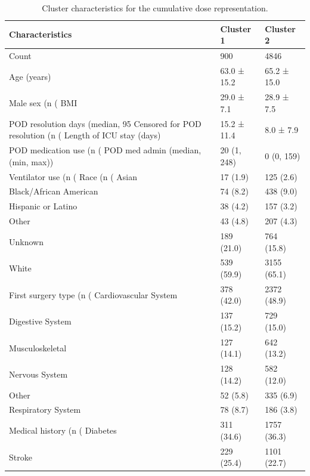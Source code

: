\begin{table}

\caption{Cluster characteristics for the cumulative dose representation.}
\centering
\begin{tabular}[t]{lll}
\toprule
Characteristics & Cluster 1 & Cluster 2\\
\midrule
Count & 900 & 4846\\
Age (years) & 63.0 ± 15.2 & 65.2 ± 15.0\\
Male sex (n (%
BMI & 29.0 ± 7.1 & 28.9 ± 7.5\\
POD resolution days (median, 95%
\addlinespace
Censored for POD resolution (n (%
Length of ICU stay (days) & 15.2 ± 11.4 & 8.0 ± 7.9\\
POD medication use (n (%
POD med admin (median, (min, max)) & 20 (1, 248) & 0 (0, 159)\\
Ventilator use (n (%
\addlinespace
Race (n (%
Asian & 17 (1.9) & 125 (2.6)\\
Black/African American & 74 (8.2) & 438 (9.0)\\
Hispanic or Latino & 38 (4.2) & 157 (3.2)\\
Other & 43 (4.8) & 207 (4.3)\\
\addlinespace
Unknown & 189 (21.0) & 764 (15.8)\\
White & 539 (59.9) & 3155 (65.1)\\
First surgery type (n (%
Cardiovascular System & 378 (42.0) & 2372 (48.9)\\
Digestive System & 137 (15.2) & 729 (15.0)\\
\addlinespace
Musculoskeletal & 127 (14.1) & 642 (13.2)\\
Nervous System & 128 (14.2) & 582 (12.0)\\
Other & 52 (5.8) & 335 (6.9)\\
Respiratory System & 78 (8.7) & 186 (3.8)\\
Medical history (n (%
\addlinespace
Diabetes & 311 (34.6) & 1757 (36.3)\\
Stroke & 229 (25.4) & 1101 (22.7)\\

\end{tabular}
\end{table}
